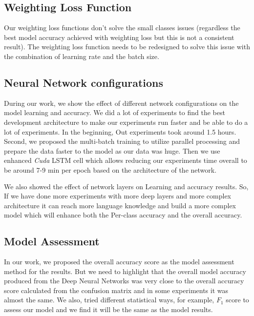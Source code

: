 \subsection{Weighting Loss Function}
Our weighting loss functions don’t solve the small classes issues (regardless the best model accuracy achieved with weighting loss but this is not a consistent result). The weighting loss function needs to be redesigned to solve this issue with the combination of learning rate and the batch size.

\subsection{Neural Network configurations}

During our work, we show the effect of different network configurations on the model learning and accuracy. We did a lot of experiments to find the best development architecture to make our experiments run faster and be able to do a lot of experiments. In the beginning, Out experiments took around 1.5 hours. Second, we proposed the multi-batch training to utilize parallel processing and prepare the data faster to the model as our data was huge. Then we use enhanced \textit{Cuda} LSTM cell which allows reducing our experiments time overall to be around 7-9 min per epoch based on the architecture of the network.

We also showed the effect of network layers on Learning and accuracy results. So, If we have done more experiments with more deep layers and more complex architecture it can reach more language knowledge and build a more complex model which will enhance both the Per-class accuracy and the overall accuracy.
\subsection{Model Assessment}

In our work, we proposed the overall accuracy score as the model assessment method for the results. But we need to highlight that the overall model accuracy produced from the Deep Neural Networks was very close to the overall accuracy score calculated from the confusion matrix and in some experiments it was almost the same. We also, tried different statistical ways, for example, $F_1$ score to assess our model and we find it will be the same as the model results.


